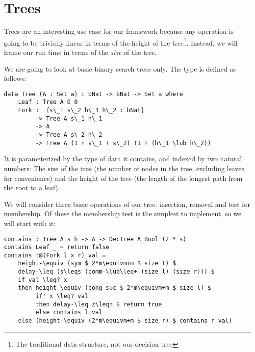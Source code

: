 
\section{Trees}
\label{sec:trees}
Trees are an interesting use case for our framework because any operation is going to be trivially linear in terms of the height of the tree\footnote{The traditional data structure, not our decision tree}. Instead, we will frame our run time in terms of the \emph{size} of the tree.

We are going to look at basic binary search trees only. The type is defined as follows:

\noindent\begin{minipage}{\linewidth}
\begin{lstlisting}[caption={The Tree type},label={lst:tree:def},emph={Tree,Leaf,Fork}]
data Tree (A : Set a) : bNat -> bNat -> Set a where
    Leaf : Tree A 0 0
    Fork :  {s\_1 s\_2 h\_1 h\_2 : bNat}
         -> Tree A s\_1 h\_1
         -> A
         -> Tree A s\_2 h\_2
         -> Tree A (1 + s\_1 + s\_2) (1 + (h\_1 \lub h\_2))
\end{lstlisting}
\end{minipage}

It is parameterized by the type of data it contains, and indexed by two natural numbers: The size of the tree (the number of nodes in the tree, excluding leaves for convenience) and the height of the tree (the length of the longest path from the root to a leaf).

We will consider three basic operations of our tree: insertion, removal and test for membership. Of these the membership test is the simplest to implement, so we will start with it:

\begin{lstlisting}[caption={Tree membership test},label={lst:tree:contains},emph={Tree,contains,Bool,Leaf,Fork,return,if,then,else}]
contains : Tree A s h -> A -> DecTree A Bool (2 * s)
contains Leaf _ = return false
contains t@(Fork l x r) val =
    height-\equiv (sym $ 2*m\equivm+m $ size t) $
    delay-\leq (s\leqs (comm-\lub\leq+ (size l) (size r))) $
    if val \leq? x
    then height-\equiv (cong suc $ 2*m\equivm+m $ size l) $
         if' x \leq? val
         then delay-\leq z\leqn $ return true
         else contains l val
    else (height-\equiv (2*m\equivm+m $ size r) $ contains r val)
\end{lstlisting}

